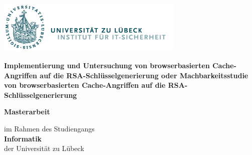 \begin{titlepage}

{

\vspace*{1cm}

\includegraphics[height=2.5cm]{pictures/its-logo.png}

\vspace*{2.5cm}




\textbf{\LARGE{Implementierung und Untersuchung von browserbasierten Cache-Angriffen auf die RSA-Schlüsselgenerierung oder Machbarkeitsstudie von browserbasierten Cache-Angriffen auf die RSA-Schlüsselgenerierung}} \vspace*{1em} \\
\textit{\LARGE{}}

\vspace*{2em}

\textbf{Masterarbeit}

\vspace*{1em}

im Rahmen des Studiengangs \\ %
\textbf{Informatik} \\ %
der Universität zu Lübeck %

}
\end{titlepage}
